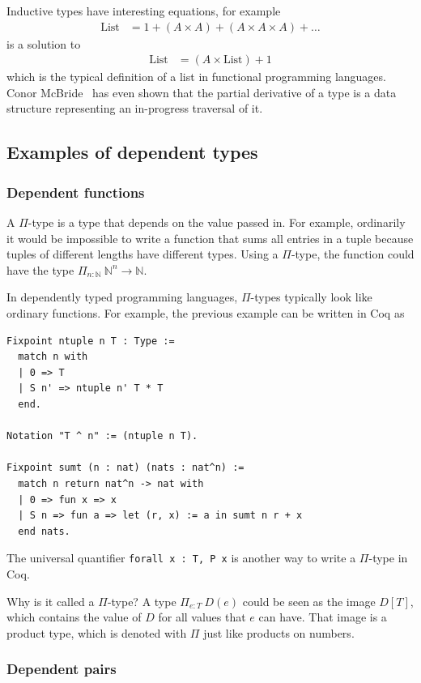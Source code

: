 \documentclass[english, 12pt, a4paper, sci, a-1b, online]{aaltothesis}
\newcommand\icoq[1]{\texttt{#1}}
\begin{document}
Inductive types have interesting equations, for example
\begin{align*}
  \text{List} &= 1 + (A \times A) + (A \times A \times A) + \ldots
\end{align*}
is a solution to
\begin{align*}
  \text{List} &= (A \times \text{List}) + 1
\end{align*}
which is the typical definition of a list in functional programming languages. Conor McBride~\cite{typeDerivative} has even shown that the partial derivative of a type is a data structure representing an in-progress traversal of it.

\subsection{Examples of dependent types}
\subsubsection{Dependent functions}

A $\Pi$-type is a type that depends on the value passed in. For example, ordinarily it would be impossible to write a function that sums all entries in a tuple because tuples of different lengths have different types. Using a $\Pi$-type, the function could have the type $\Pi_{n : \mathbb N}~\mathbb N^n \to \mathbb N$.

In dependently typed programming languages, $\Pi$-types typically look like ordinary functions. For example, the previous example can be written in Coq as
\begin{verbatim}
Fixpoint ntuple n T : Type :=
  match n with
  | 0 => T
  | S n' => ntuple n' T * T
  end.

Notation "T ^ n" := (ntuple n T).

Fixpoint sumt (n : nat) (nats : nat^n) :=
  match n return nat^n -> nat with
  | 0 => fun x => x
  | S n => fun a => let (r, x) := a in sumt n r + x
  end nats.
\end{verbatim}

The universal quantifier \icoq{forall x : T, P x} is another way to write a $\Pi$-type in Coq.

Why is it called a $\Pi$-type? A type $\Pi_{e:T}~D(e)$ could be seen as the image $D[T]$, which contains the value of $D$ for all values that $e$ can have. That image is a product type, which is denoted with $\Pi$ just like products on numbers.

\subsubsection{Dependent pairs}
\end{document}
